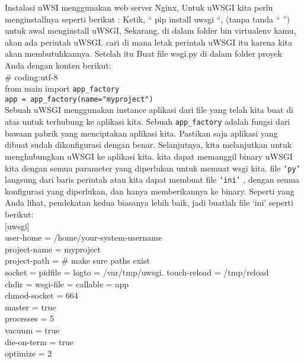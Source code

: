 \documentclass[12pt, times new roman, a4paper]{Article}
\begin{document}
	Instalasi uWSI menggunakan web server Nginx, Untuk uWSGI kita perlu menginstallnya seperti berikut :
Ketik, “ pip install uwsgi “, (tanpa tanda “ ”) untuk awal menginstall uWSGI,
Sekarang, di dalam folder bin virtualenv kamu, akan ada perintah uWSGI. cari
di mana letak perintah uWSGI itu karena kita akan membutuhkannya. Setelah itu
Buat file wsgi.py di dalam folder proyek Anda dengan konten berikut:\\
\# coding:utf-8\\
from main import \verb|app_factory|\\
\verb|app = app_factory(name="myproject")|\\
	
	Sebuah uWSGI menggunakan instance aplikasi dari file yang telah kita buat di atas untuk terhubung ke aplikasi kita. Sebuah \verb|app_factory| adalah fungsi dari bawaan pabrik yang menciptakan aplikasi kita. Pastikan saja aplikasi yang dibuat sudah dikonfigurasi dengan benar. Selanjutnya, kita melanjutkan untuk menghubungkan uWSGI ke aplikasi kita. kita dapat memanggil binary uWSGI kita dengan semua parameter yang diperlukan untuk memuat wsgi kita. file \verb|‘py’| langsung dari baris perintah atau kita dapat membuat file \verb|‘ini’| , dengan semua konfigurasi yang diperlukan, dan hanya memberikannya ke binary. Seperti yang Anda lihat, pendekatan kedua biasanya lebih baik, jadi buatlah file ‘ini’ seperti berikut:\\

[uwsgi]\\
user-home = /home/your-system-username\\
project-name = myproject\\
project-path = %
\# make sure paths exist\\
socket = %
pidfile = %
logto = /var/tmp/uwsgi.%
touch-reload = /tmp/reload\\
chdir = %
wsgi-file = %
callable = app\\
chmod-socket = 664\\
master = true\\
processes = 5\\
vacuum = true\\
die-on-term = true\\
optimize = 2\\
\end{document}
